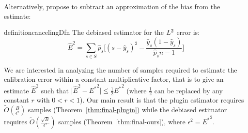 Alternatively, \cite{brocker2012empirical, ferro2012bias} propose to subtract an approximation of the bias from the estimate:

\begin{restatable}{definition}{cancelingDfn}
  The debiased estimator for the $L^2$ error is:
\[ \hat{E}^2 = \sum_{s \in S} \hat{p}_s \Big[ (s - \hat{y}_s)^2 - \frac{\hat{y}_s(1 - \hat{y}_s)}{\hat{p}_sn-1} \Big] \]
\end{restatable}

We are interested in analyzing the number of samples required to estimate the calibration error within a constant multiplicative factor, that is to give an estimate $\hat{E}^2$ such that $\lvert \hat{E}^2 - {E^*}^2 \rvert \leq \frac{1}{2}{E^*}^2$ (where $\frac{1}{2}$ can be replaced by any constant $r$ with $0 < r < 1$). Our main result is that the plugin estimator requires $\widetilde{O}(\frac{B}{\epsilon^2})$ samples (Theorem~\ref{thm:final-plugin}) while the debiased estimator requires $\widetilde{O}(\frac{\sqrt{B}}{\epsilon^2})$ samples (Theorem~\ref{thm:final-ours}), where $\epsilon^2 = {E^*}^2$.





